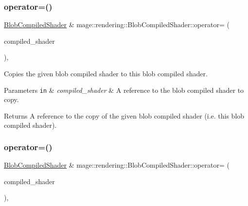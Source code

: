 \subsubsection{\texorpdfstring{operator=()}{operator=()}\hspace{0.1cm}{\footnotesize\ttfamily [1/2]}}
{\footnotesize\ttfamily \hyperlink{classmage_1_1rendering_1_1_blob_compiled_shader}{Blob\+Compiled\+Shader} \& mage\+::rendering\+::\+Blob\+Compiled\+Shader\+::operator= (\begin{DoxyParamCaption}\item[{const \hyperlink{classmage_1_1rendering_1_1_blob_compiled_shader}{Blob\+Compiled\+Shader} \&}]{compiled\+\_\+shader }\end{DoxyParamCaption})\hspace{0.3cm}{\ttfamily [default]}, {\ttfamily [noexcept]}}

Copies the given blob compiled shader to this blob compiled shader.


\begin{DoxyParams}[1]{Parameters}
\mbox{\tt in}  & {\em compiled\+\_\+shader} & A reference to the blob compiled shader to copy. \\
\hline
\end{DoxyParams}
\begin{DoxyReturn}{Returns}
A reference to the copy of the given blob compiled shader (i.\+e. this blob compiled shader). 
\end{DoxyReturn}
\hypertarget{classmage_1_1rendering_1_1_blob_compiled_shader_a14954683e57897937b0e0178b5a726a4}{}\label{classmage_1_1rendering_1_1_blob_compiled_shader_a14954683e57897937b0e0178b5a726a4} 
\subsubsection{\texorpdfstring{operator=()}{operator=()}\hspace{0.1cm}{\footnotesize\ttfamily [2/2]}}
{\footnotesize\ttfamily \hyperlink{classmage_1_1rendering_1_1_blob_compiled_shader}{Blob\+Compiled\+Shader} \& mage\+::rendering\+::\+Blob\+Compiled\+Shader\+::operator= (\begin{DoxyParamCaption}\item[{\hyperlink{classmage_1_1rendering_1_1_blob_compiled_shader}{Blob\+Compiled\+Shader} \&\&}]{compiled\+\_\+shader }\end{DoxyParamCaption})\hspace{0.3cm}{\ttfamily [default]}, {\ttfamily [noexcept]}}

